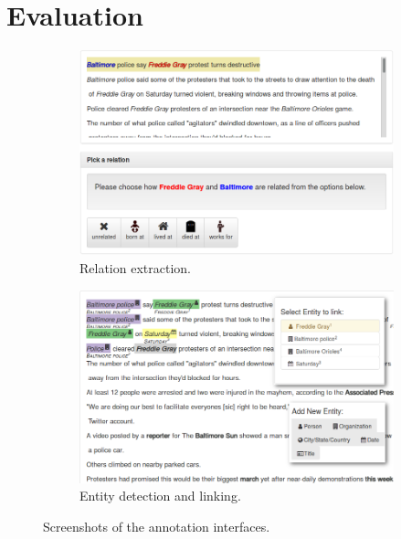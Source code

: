 \section{Evaluation}
\label{sec:evaluation}

\begin{figure}[h]
\begin{subfigure}{0.49\textwidth}
  \includegraphics[width=\textwidth]{figures/relation-interface}
  \caption{\label{fig:relation-interface} Relation extraction.}
\end{subfigure}
\hfill
\begin{subfigure}{0.49\textwidth}
  \includegraphics[width=\textwidth]{figures/extraction-interface}
  \caption{\label{fig:entity-interface} Entity detection and linking.}
\end{subfigure}
\caption{\label{fig:interfaces} Screenshots of the annotation interfaces.}
\end{figure}


